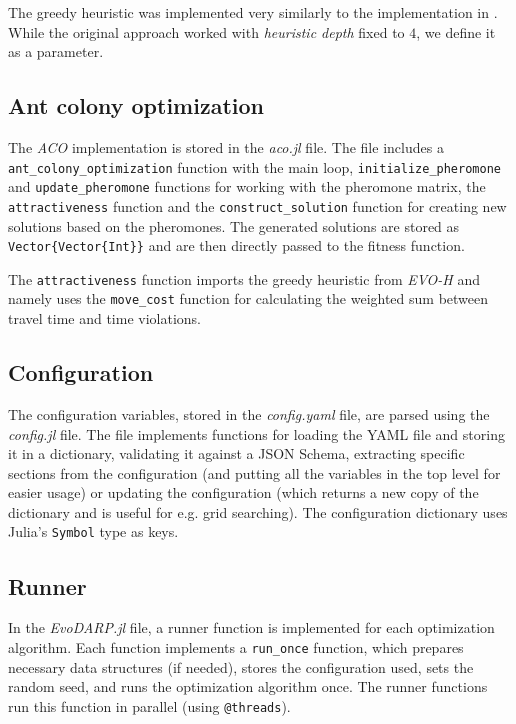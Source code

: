The greedy heuristic was implemented very similarly to the implementation in \cite{Baugh1998INTRACTABILITYOT}. While the original approach worked with \textit{heuristic depth} fixed to $4$, we define it as a parameter.

\subsection{Ant colony optimization}

The \textit{ACO} implementation is stored in the \textit{aco.jl} file. The file includes a \texttt{ant\_colony\_optimization} function with the main loop, \texttt{initialize\_pheromone} and \texttt{update\_pheromone} functions for working with the pheromone matrix, the \texttt{attractiveness} function and the \texttt{construct\_solution} function for creating new solutions based on the pheromones. The generated solutions are stored as \texttt{Vector\{Vector\{Int\}\}} and are then directly passed to the fitness function.

The \texttt{attractiveness} function imports the greedy heuristic from \textit{EVO-H} and namely uses the \texttt{move\_cost} function for calculating the weighted sum between travel time and time violations.

\subsection{Configuration}

The configuration variables, stored in the \textit{config.yaml} file, are parsed using the \textit{config.jl} file. The file implements functions for loading the YAML file and storing it in a dictionary, validating it against a JSON Schema, extracting specific sections from the configuration (and putting all the variables in the top level for easier usage) or updating the configuration (which returns a new copy of the dictionary and is useful for e.g. grid searching). The configuration dictionary uses Julia's \texttt{Symbol} type as keys.

\subsection{Runner}

In the \textit{EvoDARP.jl} file, a runner function is implemented for each optimization algorithm. Each function implements a \texttt{run\_once} function, which prepares necessary data structures (if needed), stores the configuration used, sets the random seed, and runs the optimization algorithm once. The runner functions run this function in parallel (using \texttt{@threads}).

